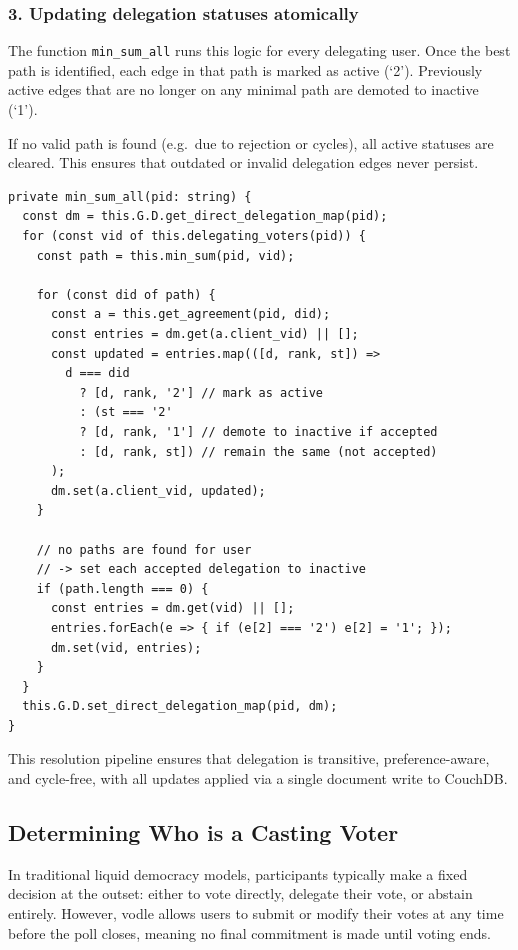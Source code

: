 \subsubsection*{3. Updating delegation statuses atomically}

The function \texttt{min\_sum\_all} runs this logic for every delegating user. Once the best path is identified, each edge in that path is marked as active (`2'). Previously active edges that are no longer on any minimal path are demoted to inactive (`1').

If no valid path is found (e.g.\ due to rejection or cycles), all active statuses are cleared. This ensures that outdated or invalid delegation edges never persist.

\begin{verbatim}
private min_sum_all(pid: string) {
  const dm = this.G.D.get_direct_delegation_map(pid);
  for (const vid of this.delegating_voters(pid)) {
    const path = this.min_sum(pid, vid);

    for (const did of path) {
      const a = this.get_agreement(pid, did);
      const entries = dm.get(a.client_vid) || [];
      const updated = entries.map(([d, rank, st]) =>
        d === did
          ? [d, rank, '2'] // mark as active
          : (st === '2'
          ? [d, rank, '1'] // demote to inactive if accepted
          : [d, rank, st]) // remain the same (not accepted)
      );
      dm.set(a.client_vid, updated);
    }

    // no paths are found for user
    // -> set each accepted delegation to inactive
    if (path.length === 0) {
      const entries = dm.get(vid) || [];
      entries.forEach(e => { if (e[2] === '2') e[2] = '1'; });
      dm.set(vid, entries);
    }
  }
  this.G.D.set_direct_delegation_map(pid, dm);
}
\end{verbatim}

This resolution pipeline ensures that delegation is transitive, preference-aware, and cycle-free, with all updates applied via a single document write to CouchDB.

\subsection{Determining Who is a Casting Voter}

In traditional liquid democracy models, participants typically make a fixed decision at the outset: either to vote directly, delegate their vote, or abstain entirely. However, vodle allows users to submit or modify their votes at any time before the poll closes, meaning no final commitment is made until voting ends.

